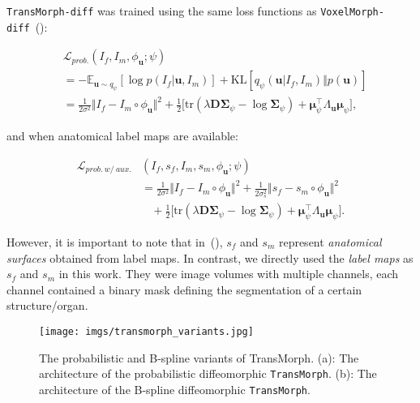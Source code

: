 \documentclass[times,twocolumn,final]{elsarticle}
\begin{document}
\texttt{TransMorph-diff} was trained using the same loss functions as \texttt{VoxelMorph-diff}~(\cite{dalca2019unsupervised}):
\begin{linenomath}
\begin{equation}
\label{eqn:L_prob}
    \begin{split}
        &\mathcal{L}_{prob.}(I_f, I_m, \phi_\mathbf{u}; \psi)\\&=-\mathbb{E}_{\mathbf{u}\sim q_{\psi}}\left[\log p(I_f|\mathbf{u}, I_m)\right]+\text{KL}\left[q_\psi(\mathbf{u}|I_f, I_m)\Vert p(\mathbf{u})\right]\\
        &=\frac{1}{2\sigma^2}\Vert I_f-I_m\circ\phi_\mathbf{u}\Vert^2+\frac{1}{2}\Bigg[\text{tr}(\lambda\mathbf{D}\mathbf{\Sigma}_\psi-\log \mathbf{\Sigma}_\psi)+\mathbf{\mu}^\top_\psi\Lambda_\mathbf{u}\mathbf{\mu}_\psi\Bigg],
    \end{split}
\end{equation}
\end{linenomath}
and when anatomical label maps are available:
\begin{linenomath}
\begin{equation}
\label{eqn:l_prob_w_seg}
    \begin{split}
        \mathcal{L}_{prob.\ w/\ aux.}&(I_f, s_f, I_m, s_m, \phi_\mathbf{u}; \psi)\\
        &=\frac{1}{2\sigma^2}\Vert I_f-I_m\circ\phi_\mathbf{u}\Vert^2+\frac{1}{2\sigma_s^2}\Vert s_f-s_m\circ\phi_\mathbf{u}\Vert^2\\
        &\ \ \ \ +\frac{1}{2}\Bigg[\text{tr}(\lambda\mathbf{D}\mathbf{\Sigma}_\psi-\log \mathbf{\Sigma}_\psi)+\mathbf{\mu}^\top_\psi\Lambda_\mathbf{u}\mathbf{\mu}_\psi\Bigg].
    \end{split}
\end{equation}
\end{linenomath}
However, it is important to note that in~(\cite{dalca2019unsupervised}), $s_f$ and $s_m$ represent \textit{anatomical surfaces} obtained from label maps. In contrast, we directly used the \textit{label maps} as $s_f$ and $s_m$ in this work. They were image volumes with multiple channels, each channel contained a binary mask defining the segmentation of a certain structure/organ.
\begin{figure}[!h]
\centering
\texttt{[image: imgs/transmorph\_variants.jpg]}
\caption{The probabilistic and B-spline variants of TransMorph. (a): The architecture of the probabilistic diffeomorphic \texttt{TransMorph}. (b): The architecture of the B-spline diffeomorphic \texttt{TransMorph}.\label{fig:transmorph_var}}
\end{figure}
\end{document}
